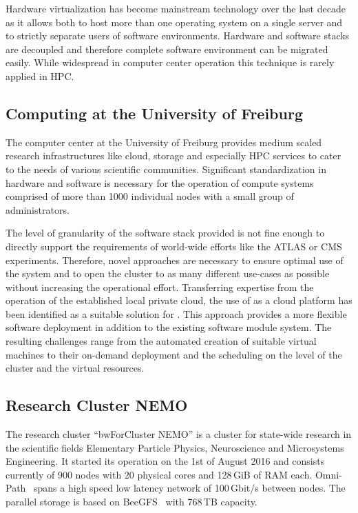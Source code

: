 Hardware virtualization has become mainstream technology over the last decade as it allows
both to host more than one operating system on a single server and to strictly
separate users of software environments.
Hardware and software stacks are decoupled and therefore complete software
environment can be migrated easily.
While widespread in computer center
operation this technique is rarely applied in HPC.

\subsection{Computing at the University of Freiburg}

The computer center at the University of Freiburg provides
medium scaled research
infrastructures like cloud, storage and especially HPC services to cater to the
needs of various scientific communities. Significant standardization
in hardware and software is necessary for the operation of compute systems comprised of
more than 1000 individual nodes with a small group of administrators.

The level of granularity of the software stack provided is not fine enough to
directly support the requirements of world-wide efforts like the
ATLAS or CMS experiments.
Therefore, novel approaches are necessary to ensure optimal use of the system and to open the cluster to as many different use-cases as
possible without increasing the operational effort.
Transferring expertise from the operation of the established local
private cloud, %
the use of \Openstack as a cloud platform has been identified
as a
suitable solution for \NEMO. This approach provides a more flexible software
deployment in addition to the existing software module system.
The resulting challenges range from the automated creation of suitable
virtual machines to their on-demand deployment and the scheduling on
the level of the cluster and the virtual resources.

\subsection{Research Cluster NEMO}

The research cluster ``bwForCluster NEMO'' is a cluster for state-wide
research in the scientific fields Elementary Particle Physics, Neuroscience and
Microsystems Engineering. It started its operation on the 1st of August 2016
and consists currently of 900 nodes with 20 physical cores and 128\,GiB of RAM each.
Omni-Path~\cite{Omnipath} spans a high speed low latency network of 100\,Gbit/s between nodes.
The parallel storage is based on BeeGFS~\cite{BeeGFS} with
768\,TB capacity.

